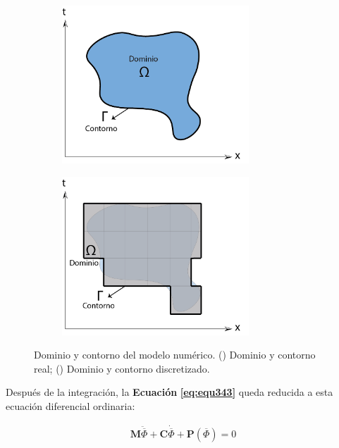 \begin{figure}[!ht]
\centering
\begin{subfigure}[b]{.45\textwidth}
        \centering
        \includegraphics[width=7cm]{Imagenes/Dominio_Real.png}
        \caption{}
        \label{fig:fig32a}
\end{subfigure}
\hfill
\begin{subfigure}[b]{.45\textwidth}
        \centering
        \includegraphics[width=7cm]{Imagenes/Dominio_FEM.png}
        \caption{}
        \label{fig:fig32b}
\end{subfigure}
\captionsetup{format=plain}
\caption[Dominio y contorno del modelo numérico]{Dominio y contorno del modelo numérico. () Dominio y contorno real; () Dominio y contorno discretizado.} 
\label{fig:fig32}
\end{figure}

Después de la integración, la \textbf{Ecuación} \textbf{\ref{eq:equ343}} queda reducida a esta ecuación diferencial ordinaria:

\begin{ceqn} %
\begin{gather}\label{eq:equ344}
\mathbf{M}\ddot{\overline{\Phi}} + \mathbf{C}\dot{\overline{\Phi}} + \mathbf{P}(\overline{\Phi}) = 0
\end{gather}   
\end{ceqn}

